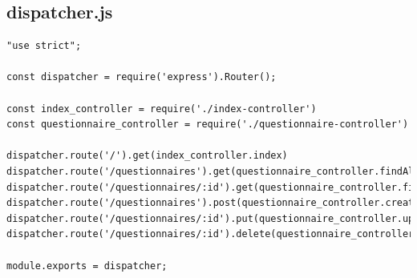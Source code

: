 \subsection{dispatcher.js}
\begin{verbatim}
"use strict";

const dispatcher = require('express').Router();

const index_controller = require('./index-controller')
const questionnaire_controller = require('./questionnaire-controller')

dispatcher.route('/').get(index_controller.index)
dispatcher.route('/questionnaires').get(questionnaire_controller.findAll)
dispatcher.route('/questionnaires/:id').get(questionnaire_controller.findById)
dispatcher.route('/questionnaires').post(questionnaire_controller.create)
dispatcher.route('/questionnaires/:id').put(questionnaire_controller.update)
dispatcher.route('/questionnaires/:id').delete(questionnaire_controller.delete)

module.exports = dispatcher;
\end{verbatim}


